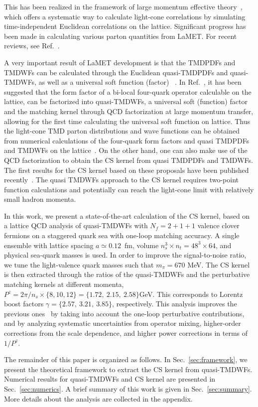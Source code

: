 This has been realized in the framework of large momentum effective theory~\cite{Ji:2013dva,Ji:2014gla}, which offers a systematic way to calculate light-cone correlations by simulating time-independent Euclidean correlations on the lattice. Significant progress has been made in calculating various parton quantities from LaMET. For recent reviews, see Ref.~\cite{Cichy:2018mum,Ji:2020ect}. 

A very important result of LaMET development is that the TMDPDFs and TMDWFs can be calculated through the Euclidean quasi-TMDPDFs and quasi-TMDWFs, as well as a universal soft function (factor) ~\cite{Ebert:2019okf,Ji:2019sxk,Ji:2019ewn,Ji:2021znw}. In Ref.~\cite{Ji:2019sxk}, it has been suggested that the form factor of a bi-local four-quark operator calculable on the lattice, can be factorized into quasi-TMDWFs, a universal soft (function) factor and the matching kernel through QCD factorization at large momentum transfer, allowing
for the first time calculating the universal soft function on lattice. Thus the light-cone TMD parton distributions and wave functions can be obtained from numerical calculations of the four-quark form factors and quasi TMDPDFs and TMDWFs on the lattice~\cite{Ji:2019sxk,Ji:2019ewn}.  On the other hand, one can also make use of the QCD factorization to obtain the CS kernel from quasi TMDPDFs and TMDWFs. The first results for the CS kernel based on these proposals have been published recently~\cite{Shanahan:2020zxr,LatticeParton:2020uhz,Schlemmer:2021aij,Li:2021wvl,Shanahan:2021tst}. The quasi TMDWFs approach
to the CS kernel requires two-point function calculations 
and potentially can reach the light-cone limit with relatively
small hadron momenta. 

In this work, we present a state-of-the-art calculation of the CS kernel, based on a lattice QCD analysis of quasi-TMDWFs with $N_f=2+1+1$ valence clover fermions on a staggered quark sea with one-loop matching accuracy. A single ensemble with lattice spacing $a\simeq0.12$~fm,  volume $n_s^3\times n_t=48^3\times64$, and  physical sea-quark masses is used. In order to improve the signal-to-noise ratio, we tune the light-valence quark masses such that $m_\pi = 670$ MeV. The CS  kernel is then extracted through the ratios of the quasi-TMDWFs and the perturbative matching kernels at different momenta, $P^z=2\pi/n_s\times\{8,10,12\}=\{1.72,~2.15,~2.58\}$GeV. This  corresponds to Lorentz boost factors  $\gamma=\{2.57,~3.21,~3.85\}$, respectively. This analysis improves the previous ones~\cite{LatticeParton:2020uhz,Li:2021wvl} by taking into account  the one-loop perturbative contributions, and by analyzing  systematic uncertainties from operator mixing,  higher-order corrections from the scale dependence, and higher power corrections in terms of $1/P^z$.  
 
The remainder of this paper is organized as follows. 
In Sec.~\ref{sec:framework}, we present the theoretical framework to extract the CS kernel from  quasi-TMDWFs. Numerical results for quasi-TMDWFs and CS kernel are presented in Sec.~\ref{sec:numerics}. A brief  summary of this work is given in Sec.~\ref{sec:summary}.  More details about the analysis are collected in the appendix. 
